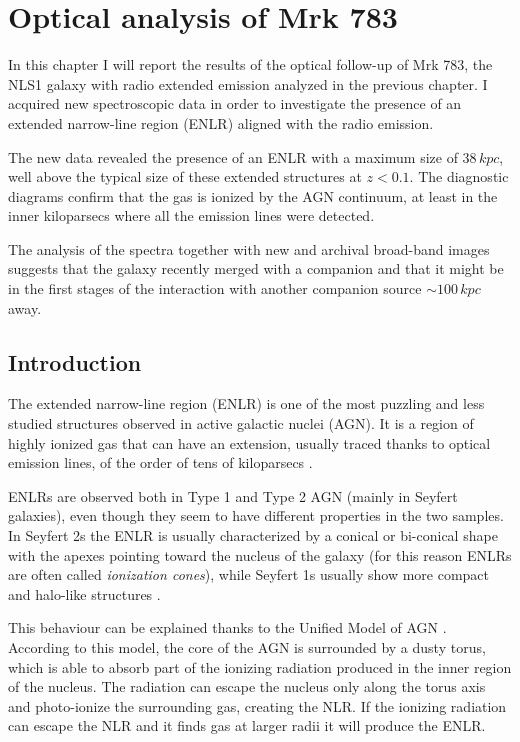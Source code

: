 \documentclass[../thesis.tex]{subfiles}
\begin{document}
\chapter{Optical analysis of Mrk 783}
\label{cap:paper3}

In this chapter I will report the results of the optical follow-up of Mrk 783, the NLS1 galaxy with radio extended emission analyzed in the previous chapter.
I acquired new spectroscopic data in order to investigate the presence of an extended narrow-line region (ENLR) aligned with the radio emission.

The new data revealed the presence of an ENLR with a maximum size of $38\,\si{kpc}$, well above the typical size of these extended structures at $z<0.1$.
The diagnostic diagrams confirm that the gas is ionized by the AGN continuum, at least in the inner kiloparsecs where all the emission lines were detected.

The analysis of the spectra together with new and archival broad-band images suggests that the galaxy recently merged with a companion and that it might be in the first stages of the interaction with another companion source $\sim 100\,\si{kpc}$ away. 

\section{Introduction}
\label{sec:pap3_intro}

The extended narrow-line region (ENLR) is one of the most puzzling and less studied structures observed in active galactic nuclei (AGN).
It is a region of highly ionized gas that can have an extension, usually traced thanks to optical emission lines, of the order of tens of kiloparsecs \citep[e.g.][]{Stockton87,Tadhunter89,Keel12}.

ENLRs are observed both in Type 1 and Type 2 AGN (mainly in Seyfert galaxies), even though they seem to have different properties in the two samples.
In Seyfert 2s the ENLR is usually characterized by a conical or bi-conical shape with the apexes pointing toward the nucleus of the galaxy (for this reason ENLRs are often called \emph{ionization cones}), while Seyfert 1s usually show more compact and halo-like structures \citep{Schmitt03,Schmitt03b}.

This behaviour can be explained thanks to the Unified Model of AGN \citep{Antonucci93,Urry95}.
According to this model, the core of the AGN is surrounded by a dusty torus, which is able to absorb part of the ionizing radiation produced in the inner region of the nucleus.
The radiation can escape the nucleus only along the torus axis and photo-ionize the surrounding gas, creating the NLR.
If the ionizing radiation can escape the NLR and it finds gas at larger radii it will produce the ENLR.
\end{document}
